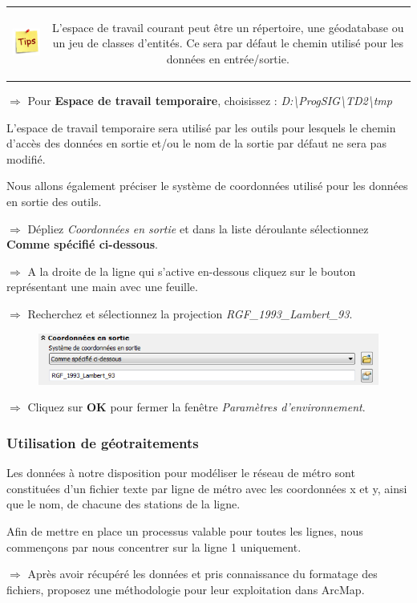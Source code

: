 \documentclass[11pt]{article}
\newcommand{\action}{$\Rightarrow$ }
\newenvironment{note}{%
	\begin{tabular}[t t]{c c}
		\includegraphics{img/tips.png}
		 &
		\begin{minipage}[c]{0.9\linewidth}
			\begin{sffamily}
}{%
			\end{sffamily}
		\end{minipage}
	\end{tabular}
}
\begin{document}
\begin{note}
L'espace de travail courant peut être un répertoire, une géodatabase ou un jeu de classes d'entités. Ce sera par défaut le chemin utilisé pour les données en entrée/sortie.
\end{note}

\action Pour \textbf{Espace de travail temporaire}, choisissez : \textit{D:\textbackslash{}ProgSIG\textbackslash{}TD2\textbackslash{}tmp}

L'espace de travail temporaire sera utilisé par les outils pour lesquels le chemin d'accès des données en sortie et/ou le nom de la sortie par défaut ne sera pas modifié.

Nous allons également préciser le système de coordonnées utilisé pour les données en sortie des outils.

\action Dépliez \textit{Coordonnées en sortie} et dans la liste déroulante sélectionnez \textbf{Comme spécifié ci-dessous}.

\action A la droite de la ligne qui s'active en-dessous cliquez sur le bouton représentant une main avec une feuille.

\action Recherchez et sélectionnez la projection \textit{RGF\_1993\_Lambert\_93}.
\begin{figure}[H]
	\center \includegraphics{img/td3/environnements_coordonnees.png}\\
\end{figure}

\action Cliquez sur \textbf{OK} pour fermer la fenêtre \textit{Paramètres d'environnement}.


\subsubsection{Utilisation de géotraitements}
Les données à notre disposition pour modéliser le réseau de métro sont constituées d'un fichier texte par ligne de métro avec les coordonnées x et y, ainsi que le nom, de chacune des stations de la ligne.

Afin de mettre en place un processus valable pour toutes les lignes, nous commençons par nous concentrer sur la ligne 1 uniquement.

\action Après avoir récupéré les données et pris connaissance du formatage des fichiers, proposez une méthodologie pour leur exploitation dans ArcMap.
\end{document}
